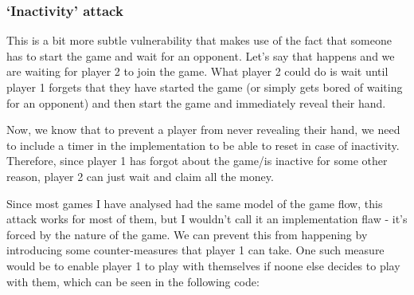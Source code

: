 \documentclass{article}
\begin{document}
    \subsubsection{`Inactivity' attack} \label{s:playown}
    This is a bit more subtle vulnerability that makes use
    of the fact that someone has to start the game and wait
    for an opponent. Let's say that happens and we are
    waiting for player 2 to join the game. What player 2
    could do is wait until player 1 forgets that they have
    started the game (or simply gets bored of waiting for an
    opponent) and then start the game and immediately reveal
    their hand.
    \newline

    \noindent Now, we know that to prevent a player from
    never revealing their hand, we need to include a timer
    in the implementation to be able to reset in case of
    inactivity. Therefore, since player 1 has forgot about
    the game/is inactive for some other reason, player 2
    can just wait and claim all the money.
    \newline
    
    \noindent Since most games I have analysed had the same
    model of the game flow, this attack works for most of
    them, but I wouldn't call it an implementation flaw -
    it's forced by the nature of the game. We can prevent
    this from happening by introducing some counter-measures
    that player 1 can take. One such measure would be to
    enable player 1 to play with themselves if noone else
    decides to play with them, which can be seen in the
    following code:
\end{document}
